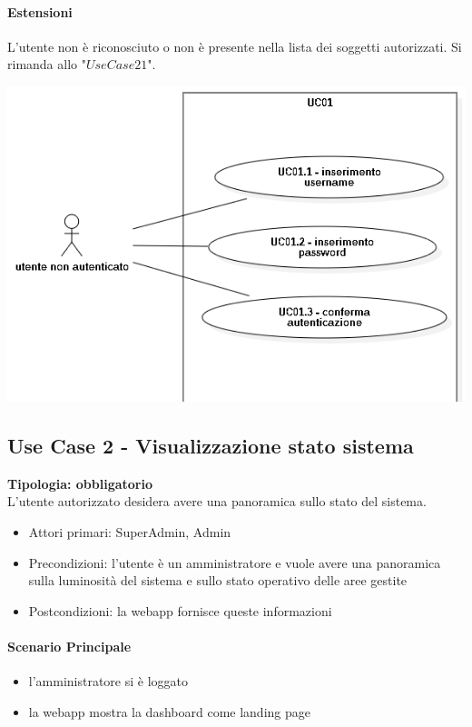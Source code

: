 \documentclass[12pt]{article}
\begin{document}
\paragraph{Estensioni} L'utente non è riconosciuto o non è presente nella lista dei soggetti autorizzati. Si rimanda allo "$Use Case 21 $".

\includegraphics[scale=0.4]{UC01.png}

\subsection{Use Case 2 - Visualizzazione stato sistema}
\textbf{Tipologia: obbligatorio} \\
L'utente autorizzato desidera avere una panoramica sullo stato del sistema.
\begin{itemize}
	\item Attori primari: SuperAdmin, Admin
	\item Precondizioni: l'utente è un amministratore e vuole avere una panoramica sulla luminosità del sistema e sullo stato operativo delle aree gestite
	\item Postcondizioni: la webapp fornisce queste informazioni
\end{itemize}
\paragraph{Scenario Principale}
\begin{itemize}
	\item l'amministratore si è loggato
	\item la webapp mostra la dashboard come landing page
\end{itemize}
\end{document}
